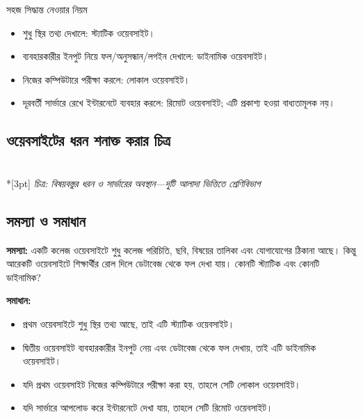 \begin{keypointbox}{সহজ সিদ্ধান্ত নেওয়ার নিয়ম}
\begin{itemize}
\item শুধু স্থির তথ্য দেখালে: স্ট্যাটিক ওয়েবসাইট।
\item ব্যবহারকারীর ইনপুট নিয়ে ফল/অনুসন্ধান/লগইন দেখালে: ডাইনামিক ওয়েবসাইট।
\item নিজের কম্পিউটারে পরীক্ষা করলে: লোকাল ওয়েবসাইট।
\item দূরবর্তী সার্ভারে রেখে ইন্টারনেটে ব্যবহার করলে: রিমোট ওয়েবসাইট; এটি প্রকাশ্য হওয়া বাধ্যতামূলক নয়।
\end{itemize}
\end{keypointbox}

\subsection{ওয়েবসাইটের ধরন শনাক্ত করার চিত্র}

\begin{center}
\\*[3pt]
\textit{চিত্র: বিষয়বস্তুর ধরন ও সার্ভারের অবস্থান—দুটি আলাদা ভিত্তিতে শ্রেণিবিভাগ}
\end{center}

\subsection{সমস্যা ও সমাধান}

\begin{practicebox}
\textbf{সমস্যা:} একটি কলেজ ওয়েবসাইটে শুধু কলেজ পরিচিতি, ছবি, বিষয়ের তালিকা এবং যোগাযোগের ঠিকানা আছে। কিন্তু আরেকটি ওয়েবসাইটে শিক্ষার্থীর রোল দিলে ডেটাবেজ থেকে ফল দেখা যায়। কোনটি স্ট্যাটিক এবং কোনটি ডাইনামিক?

\textbf{সমাধান:}
\begin{itemize}
\item প্রথম ওয়েবসাইটে শুধু স্থির তথ্য আছে, তাই এটি স্ট্যাটিক ওয়েবসাইট।
\item দ্বিতীয় ওয়েবসাইট ব্যবহারকারীর ইনপুট নেয় এবং ডেটাবেজ থেকে ফল দেখায়, তাই এটি ডাইনামিক ওয়েবসাইট।
\item যদি প্রথম ওয়েবসাইট নিজের কম্পিউটারে পরীক্ষা করা হয়, তাহলে সেটি লোকাল ওয়েবসাইট।
\item যদি সার্ভারে আপলোড করে ইন্টারনেটে দেখা যায়, তাহলে সেটি রিমোট ওয়েবসাইট।
\end{itemize}
\end{practicebox}



